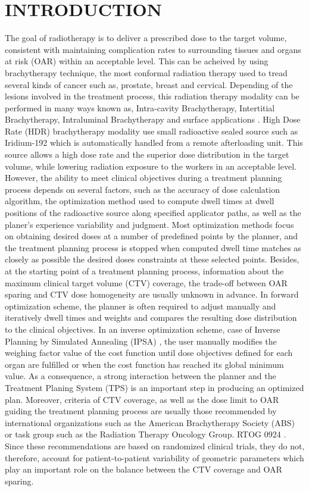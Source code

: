 \section{INTRODUCTION}
\lettrine[nindent=0em,lines=2]{T}{}he goal of radiotherapy is to deliver a prescribed dose to the target volume, consistent  with  maintaining  complication  rates to surrounding tissues and organs at risk (OAR) within an  
acceptable level. This can be acheived by using brachytherapy technique, the most conformal radiation therapy used to tread several kinds of cancer such as, prostate, breast and cervical. Depending of the lesions involved in the treatment process, this radiation therapy modality can be performed in many ways known as, Intra-cavity Brachytherapy, Intertitial Brachytherapy, Intraluminal Brachytherapy and surface applications \cite{podgorsak@2005, khan@2014}. High Dose Rate (HDR) brachytherapy modality use small radioactive sealed source such as Iridium-192 which is automatically handled from a remote afterloading unit. This source allows a high dose rate and the superior dose distribution in the target volume, while lowering radiation exposure to the workers in an acceptable level. However, the ability to meet clinical objectives during a treatment planning process depends on several factors, such as the accuracy of dose calculation algorithm, the optimization method used to compute dwell times at dwell positions of the radioactive source along specified applicator paths, as well as the planer’s experience variability and judgment. Most optimization methods focus on obtaining desired doses at a number of predefined points by the planner, and the treatment planning process is stopped when computed dwell time matches as closely as possible the desired doses constraints at these selected points. Besides, at the starting point of a treatment planning process, information about the maximum  clinical target volume (CTV) coverage, the trade-off between OAR sparing and CTV dose homogeneity are usually unknown in advance. In forward optimization scheme, the planner is often required to adjust manually and iteratively dwell times and weights and compares the resulting dose distribution to the clinical objectives. In an inverse optimization scheme, case of Inverse Planning by Simulated Annealing (IPSA) \cite{lessard@2001, lessard@2002,Lessard2004}, the user manually modifies the weighing factor value of the cost function until dose objectives defined for each organ are fulfilled or when the cost function has reached its global minimum value.  As a consequence, a strong interaction between the planner and the Treatment Planing System (TPS) is an important step in producing an optimized plan. Moreover, criteria of CTV coverage, as well as the dose limit to OAR guiding the treatment planning process are usually those recommended by international organizations such as the American Brachytherapy Society (ABS) \cite{ABS} or task group such as the Radiation Therapy Oncology Group. RTOG 0924 \cite{RTOG}. Since these recommendations are based on randomized clinical trials, they do not, therefore, account for patient-to-patient variability of geometric parameters which play an important role on the balance between the CTV coverage and OAR sparing. 